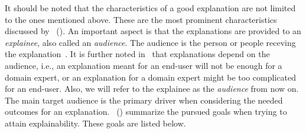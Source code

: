 It should be noted that the characteristics of a good explanation are not limited to the ones mentioned above. These are the most prominent characteristics discussed by~\citeauthor{ExplanationInAI_Miller} (\citeyear{ExplanationInAI_Miller}). An important aspect is that the explanations are provided to an \emph{explainee}, also called an \emph{audience}. The audience is the person or people receving the explanation~\parencite{XAIConceptsTaxonomies_Arrieta}. It is further noted in~\parencite{XAIConceptsTaxonomies_Arrieta} that explanations depend on the audience, i.e., an explanation meant for an end-user will not be enough for a domain expert, or an explanation for a domain expert might be too complicated for an end-user. Also, we will refer to the explainee as the \emph{audience} from now on.\\
The main target audience is the primary driver when considering the needed outcomes for an explanation.~\citeauthor{XAIConceptsTaxonomies_Arrieta} (\citeyear{XAIConceptsTaxonomies_Arrieta}) summarize the pursued goals when trying to attain explainability. These goals are listed below.
